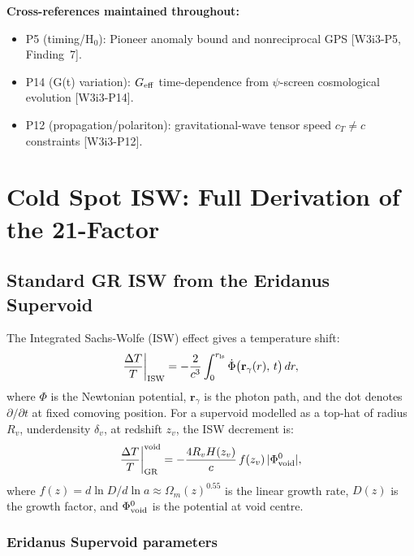 \documentclass[11pt]{article}
\newcommand{\deltaT}{\Delta T}
\begin{document}
\noindent\textbf{Cross-references maintained throughout:}
\begin{itemize}[nosep]
  \item P5 (timing/H$_0$): Pioneer anomaly bound and nonreciprocal GPS
    [W3i3-P5, Finding~7].
  \item P14 (G(t) variation): $G_{\rm eff}$ time-dependence from $\psi$-screen
    cosmological evolution [W3i3-P14].
  \item P12 (propagation/polariton): gravitational-wave tensor speed
    $c_T \neq c$ constraints [W3i3-P12].
\end{itemize}

\section{Cold Spot ISW: Full Derivation of the 21-Factor}
\label{sec:isw-derivation}

\subsection{Standard GR ISW from the Eridanus Supervoid}

The Integrated Sachs-Wolfe (ISW) effect gives a temperature shift:
\begin{equation}\label{eq:isw-standard}
  \frac{\deltaT}{T}\bigg|_{\rm ISW}
  = -\frac{2}{c^3}\int_0^{r_{\rm ls}} \dot\Phi\bigl(\mathbf{r}_\gamma(r),\,t\bigr)\,dr,
\end{equation}
where $\Phi$ is the Newtonian potential, $\mathbf{r}_\gamma$ is the photon
path, and the dot denotes $\partial/\partial t$ at fixed comoving position.
For a supervoid modelled as a top-hat of radius $R_v$, underdensity
$\delta_v$, at redshift $z_v$, the ISW decrement is:
\begin{equation}\label{eq:isw-tophat}
  \frac{\deltaT}{T}\bigg|_{\rm GR}^{\rm void}
  = -\frac{4R_v H(z_v)}{c}\,f(z_v)\,|\Phi_{\rm void}^0|,
\end{equation}
where $f(z) = d\ln D/d\ln a \approx \Omega_m(z)^{0.55}$ is the linear
growth rate, $D(z)$ is the growth factor, and $\Phi_{\rm void}^0$ is the
potential at void centre.

\subsubsection{Eridanus Supervoid parameters}
\end{document}
